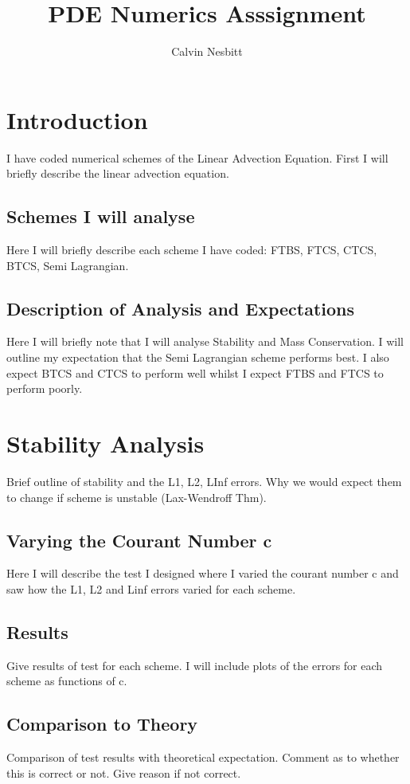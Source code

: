 \documentclass[11pt]{article}
\title{PDE Numerics Asssignment}
\author{Calvin Nesbitt}
\date{}
\begin{document}
\maketitle

\section{Introduction}
I have coded numerical schemes of the Linear Advection Equation. First I will briefly describe the linear advection equation.
\subsection{Schemes I will analyse}
Here I will briefly describe each scheme I have coded: FTBS, FTCS, CTCS, BTCS, Semi Lagrangian.
\subsection{Description of Analysis and Expectations}
Here I will briefly note that I will analyse Stability and Mass Conservation. I will outline my expectation that the Semi Lagrangian scheme performs best. I also expect BTCS and CTCS to perform well whilst I expect FTBS and FTCS to perform poorly.
\section{Stability Analysis}

Brief outline of stability and the L1, L2, LInf errors. Why we would expect them to change if scheme is unstable (Lax-Wendroff Thm). 

\subsection{Varying the Courant Number c}
Here I will describe the test I designed where I varied the courant number c and saw how the L1, L2 and Linf errors varied for each scheme. 
\subsection{Results}
Give results of test for each scheme. I will include plots of the errors for each scheme as functions of c. 
\subsection{Comparison to Theory}
Comparison of test results with theoretical expectation. Comment as to whether this is correct or not. Give reason if not correct.
\end{document}
